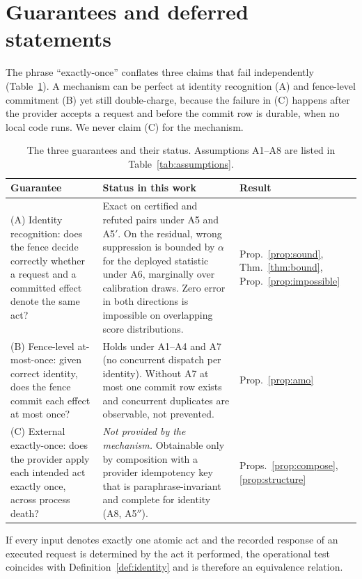 \section{Guarantees and deferred statements}\label{app:guarantees}

The phrase ``exactly-once'' conflates three claims that fail independently (Table~\ref{tab:guarantees}). A mechanism can be perfect at identity recognition (A) and fence-level commitment (B) yet still double-charge, because the failure in (C) happens after the provider accepts a request and before the commit row is durable, when no local code runs. We never claim (C) for the mechanism.


\begin{table}[!tbp]
\centering\small
\caption{The three guarantees and their status. Assumptions A1--A8 are listed in Table~\ref{tab:assumptions}.}\label{tab:guarantees}
\begin{tabularx}{\linewidth}{@{}p{3.4cm}Xp{2.2cm}@{}}
\toprule
Guarantee & Status in this work & Result \\
\midrule
(A) Identity recognition: does the fence decide correctly whether a request and a committed effect denote the same act? & Exact on certified and refuted pairs under A5 and A5$'$. On the residual, wrong suppression is bounded by $\alpha$ for the deployed statistic under A6, marginally over calibration draws. Zero error in both directions is impossible on overlapping score distributions. & Prop.~\ref{prop:sound}, Thm.~\ref{thm:bound}, Prop.~\ref{prop:impossible} \\
(B) Fence-level at-most-once: given correct identity, does the fence commit each effect at most once? & Holds under A1--A4 and A7 (no concurrent dispatch per identity). Without A7 at most one commit row exists and concurrent duplicates are observable, not prevented. & Prop.~\ref{prop:amo} \\
(C) External exactly-once: does the provider apply each intended act exactly once, across process death? & \emph{Not provided by the mechanism.} Obtainable only by composition with a provider idempotency key that is paraphrase-invariant and complete for identity (A8, A5$''$). & Props.~\ref{prop:compose}, \ref{prop:structure} \\
\bottomrule
\end{tabularx}
\end{table}

\begin{proposition}\label{prop:equivalence}
If every input denotes exactly one atomic act and the recorded response of an executed request is determined by the act it performed, the operational test coincides with Definition~\ref{def:identity} and is therefore an equivalence relation.
\end{proposition}

